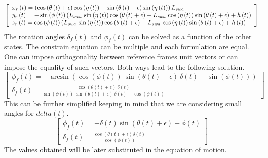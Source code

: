 \begin{equation}
    \left[ \begin {array}{l} x_{r} \left( t \right) = \left( \cos \left( 
        \theta \left( t \right) +\epsilon \right) \cos \left( \eta \left( t
         \right)  \right) +\sin \left( \theta \left( t \right) +\epsilon
         \right) \sin \left( \eta \left( t \right)  \right)  \right) L_{{\it 
        swa}}\\ y_{r} \left( t \right) =-\sin \left( \phi
         \left( t \right)  \right)  \left( L_{{\it swa}}\,\sin \left( \eta
         \left( t \right)  \right) \cos \left( \theta \left( t \right) +
        \epsilon \right) -L_{{\it swa}}\,\cos \left( \eta \left( t \right) 
         \right) \sin \left( \theta \left( t \right) +\epsilon \right) +h
         \left( t \right)  \right) \\ z_{r} \left( t
         \right) =\cos \left( \phi \left( t \right)  \right)  \left( L_{{\it 
        swa}}\,\sin \left( \eta \left( t \right)  \right) \cos \left( \theta
         \left( t \right) +\epsilon \right) -L_{{\it swa}}\,\cos \left( \eta
         \left( t \right)  \right) \sin \left( \theta \left( t \right) +
        \epsilon \right) +h \left( t \right)  \right) \end {array} \right]
\end{equation}
\normalsize
%
The rotation angles $\delta_f(t)$ and $\phi_f(t)$ can be solved as a function of the other states.
The constrain equation can be multiple and each formulation are equal. One can impose orthogonality between reference frames unit vectors or can impose the equality of such vectors. Both ways lead to the following solution.
%
\begin{equation}
\left[ \begin {array}{l} \phi_{f} \left(t \right)=-\arcsin \left(
\cos \left(\phi \left(t \right)\right)~\sin \left(\theta \left(t 
\right)+\epsilon \right)~\delta \left(t \right)-\sin \left(\phi \left(
t \right)\right)\right)\\ 
\displaystyle
\delta_{f} \left(t \right)
=\frac{\cos \left(\theta \left(t \right)+\epsilon \right)~\delta 
\left(t \right)}{\sin \left(\phi \left(t \right)\right)~\sin \left(
\theta \left(t \right)+\epsilon \right)~\delta \left(t \right)+\cos 
\left(\phi \left(t \right)\right)}\end {array} \right]
\end{equation} 
%
This can be further simplified keeping in mind that we are considering small angles for $delta(t)$.
%
\begin{equation}
    \left[ \begin {array}{l} \phi_{f} \left( t \right) =-\delta \left( t
    \right) \sin \left( \theta \left( t \right) +\epsilon \right) +\phi
    \left( t \right) \\ 
    \displaystyle
    \delta_{f} \left( t \right) ={
   \frac {\cos \left( \theta \left( t \right) +\epsilon \right) \delta
    \left( t \right) }{\cos \left( \phi \left( t \right)  \right) }}
   \end {array} \right] 
\end{equation}
%
The values obtained will be later substituted in the equation of motion.
%
